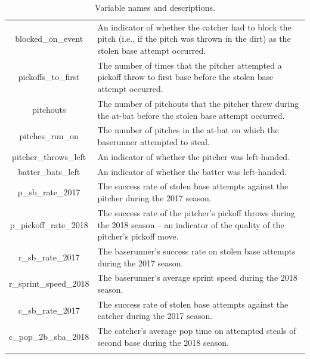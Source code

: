 \documentclass{article}
\begin{document}
\begin{center}
\begin{longtable}{c p{12cm}}
         blocked\_on\_event & An indicator of whether the catcher had to block the pitch (i.e., if the pitch was thrown in the dirt) as the stolen base attempt occurred. \\
         
         pickoffs\_to\_first & The number of times that the pitcher attempted a pickoff throw to first base before the stolen base attempt occurred. \\
         
         pitchouts & The number of pitchouts that the pitcher threw during the at-bat before the stolen base attempt occurred. \\
         
         pitches\_run\_on & The number of pitches in the at-bat on which the baserunner attempted to steal. \\
         
         pitcher\_throws\_left & An indicator of whether the pitcher was left-handed. \\
         
         batter\_bats\_left & An indicator of whether the batter was left-handed. \\
       
         p\_sb\_rate\_2017 & The success rate of stolen base attempts against the pitcher during the 2017 season. \\
         
         p\_pickoff\_rate\_2018 & The success rate of the pitcher's pickoff throws during the 2018 season -- an indicator of the quality of the pitcher's pickoff move. \\
         
         r\_sb\_rate\_2017 & The baserunner's success rate on stolen base attempts during the 2017 season. \\
         
         r\_sprint\_speed\_2018 & The baserunner's average sprint speed during the 2018 season. \\
        
         c\_sb\_rate\_2017 & The success rate of stolen base attempts against the catcher during the 2017 season. \\
         
         c\_pop\_2b\_sba\_2018 & The catcher's average pop time on attempted steals of second base during the 2018 season. \\
         \hline

         \caption{Variable names and descriptions.}
         \label{tab1_variables}
    \end{longtable}
\end{center}
\end{document}
